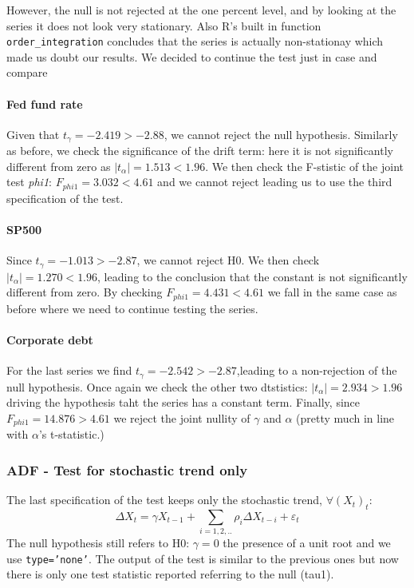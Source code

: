 \documentclass[hidelinks,12pts]{article}
\DeclareMathOperator{\1}{\mathbbm{1}}
\begin{document}
However, the null is not rejected at the one percent level, and by looking at the series it does not look very stationary. Also R's built in function \texttt{order\_integration} concludes that the series is actually non-stationay which made us doubt our results. We decided to continue the test just in case and compare %


\paragraph{Fed fund rate}
Given that $t_\gamma = -2.419 >-2.88$, we cannot reject the null hypothesis. 
Similarly as before, we check the significance of the drift term: here it is not significantly different from zero as $|t_\alpha| = 1.513 <1.96$.
We then check the F-stistic of the joint test \emph{phi1}: $F_{phi1} = 3.032 < 4.61$ and we cannot reject leading us to use the third specification of the test.  %

\paragraph{SP500}
Since $t_\gamma = -1.013> -2.87$, we cannot reject H0.
We then check $|t_\alpha| = 1.270 <1.96$, leading to the conclusion that the constant is not significantly different from zero. 
By checking $F_{phi1} = 4.431 <4.61$ we fall in the same case as before where we need to continue testing the series. 

\paragraph{Corporate debt}
For the last series we find $t_\gamma = -2.542 > -2.87$,leading to a non-rejection of the null hypothesis. 
Once again we check the other two dtstistics: $|t_\alpha| = 2.934 > 1.96$ driving the hypothesis taht the series has a constant term. 
Finally, since $F_{phi1} = 14.876 > 4.61$ we reject the joint nullity of $\gamma$ and $\alpha$ (pretty much in line with $\alpha$'s t-statistic.) 



\subsubsection{ADF - Test for stochastic trend only}
The last specification of the test keeps only the stochastic trend, $\forall (X_t)_t$: 
    \begin{equation}
        \Delta X_t = \gamma X_{t-1} +\sum_{i=1,2,..}\rho_i \Delta X_{t-i} + \varepsilon_t
    \end{equation}
The null hypothesis still refers to H0: $\gamma =0$ the presence of a unit root and we use \texttt{type='none'}.
The output of the test is similar to the previous ones but now there is only one test statistic reported referring to the null (tau1).
\end{document}
